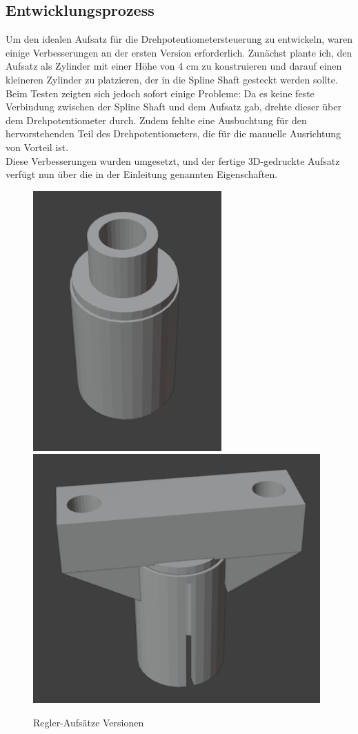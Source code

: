 \subsection{Entwicklungsprozess}
Um den idealen Aufsatz für die Drehpotentiometersteuerung zu entwickeln, waren einige Verbesserungen an der ersten Version erforderlich. Zunächst plante ich, den Aufsatz als Zylinder mit einer Höhe von 4 cm zu konstruieren und darauf einen kleineren Zylinder zu platzieren, der in die Spline Shaft gesteckt werden sollte. \\
Beim Testen zeigten sich jedoch sofort einige Probleme: Da es keine feste Verbindung zwischen der Spline Shaft und dem Aufsatz gab, drehte dieser über dem Drehpotentiometer durch. Zudem fehlte eine Ausbuchtung für den hervorstehenden Teil des Drehpotentiometers, die für die manuelle Ausrichtung von Vorteil ist.\\
Diese Verbesserungen wurden umgesetzt, und der fertige 3D-gedruckte Aufsatz verfügt nun über die in der Einleitung genannten Eigenschaften.


\begin{figure}[H]
	\centering
	\includegraphics[width=0.189\linewidth]{images/ReglerV1.png}
	\includegraphics[width=0.3\linewidth]{images/Regler.png}
	\caption[Regler-Aufsätze Versionen]{Regler-Aufsätze Versionen}
	\label{fig:Regler-Aufsätze Versionen}
\end{figure}

